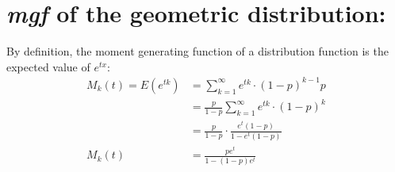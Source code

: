 \documentclass[11pt]{article}
\begin{document}
\section{\normalsize \textit{mgf} of the geometric distribution: }
By definition,  the moment generating function of a distribution function is the expected value of $e^{tx}$:
\[
\begin{aligned}
M_k(t) = E(e^{tk}) 
	&= \sum _{k=1} ^\infty e^{tk} \cdot (1-p)^{k-1} p \\
	&= \frac{p}{1-p}  \sum _{k=1} ^\infty e^{tk} \cdot (1-p)^k \\ 
	&=  \frac{p}{1-p} \cdot \frac{e^t (1-p)}{1- e^t (1-p)} \\
M_k(t)	&= \frac {pe^t}{1- (1-p)e^t } \\
\end{aligned}
\] 








\clearpage

\printbibliography [title={Reference}]


\end{document}
